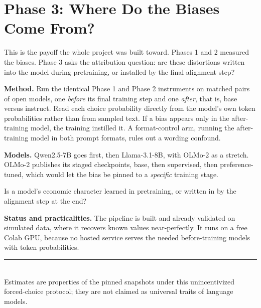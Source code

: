 \documentclass[11pt]{article}
\begin{document}
\section{Phase 3: Where Do the Biases Come From?}

This is the payoff the whole project was built toward. Phases 1 and 2 measured the biases. Phase 3
asks the attribution question: are these distortions written into the model during pretraining, or
installed by the final alignment step?

\textbf{Method.} Run the identical Phase 1 and Phase 2 instruments on matched pairs of open models,
one \emph{before} its final training step and one \emph{after}, that is, base versus instruct. Read
each choice probability directly from the model's own token probabilities rather than from sampled
text. If a bias appears only in the after-training model, the training instilled it. A format-control
arm, running the after-training model in both prompt formats, rules out a wording confound.

\textbf{Models.} Qwen2.5-7B goes first, then Llama-3.1-8B, with OLMo-2 as a stretch. OLMo-2 publishes
its staged checkpoints, base, then supervised, then preference-tuned, which would let the bias be
pinned to a \emph{specific} training stage.

\begin{resultcard}
Is a model's economic character learned in pretraining, or written in by the alignment step at the
end?
\end{resultcard}

\textbf{Status and practicalities.} The pipeline is built and already validated on simulated data,
where it recovers known values near-perfectly. It runs on a free Colab GPU, because no hosted service
serves the needed before-training models with token probabilities.

\vspace{6pt}
{\color{rulegray}\rule{\linewidth}{0.8pt}}\\[3pt]
{\footnotesize\color{mutegray} Estimates are properties of the pinned snapshots under this
unincentivized forced-choice protocol; they are not claimed as universal traits of language models.}
\end{document}
